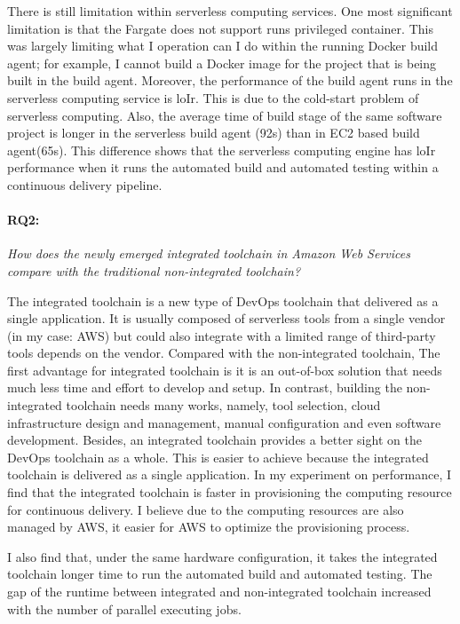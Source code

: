 There is still limitation within serverless computing services. One most significant limitation is that the Fargate does not support runs privileged container. This was largely limiting what I operation can I do within the running Docker build agent; for example, I cannot build a Docker image for the project that is being built in the build agent. Moreover, the performance of the build agent runs in the serverless computing service is loIr. This is due to the cold-start problem of serverless computing. Also, the average time of build stage of the same software project is longer in the serverless build agent (92s) than in EC2 based build agent(65s). This difference shows that the serverless computing engine has loIr performance when it runs the automated build and automated testing within a continuous delivery pipeline.
\paragraph{RQ2:} \textit{How does the newly emerged integrated toolchain in Amazon Web Services compare with the traditional non-integrated toolchain?}
\medskip
\par
The integrated toolchain is a new type of DevOps toolchain that delivered as a single application. It is usually composed of serverless tools from a single vendor (in my case: AWS) but could also integrate with a limited range of third-party tools depends on the vendor. Compared with the non-integrated toolchain, The first advantage for integrated toolchain is it is an out-of-box solution that needs much less time and effort to develop and setup. In contrast, building the non-integrated toolchain needs many works, namely, tool selection, cloud infrastructure design and management, manual configuration and even software development. Besides, an integrated toolchain provides a better sight on the DevOps toolchain as a whole. This is easier to achieve because the integrated toolchain is delivered as a single application. In my experiment on performance, I find that the integrated toolchain is faster in provisioning the computing resource for continuous delivery. I believe due to the computing resources are also managed by AWS, it easier for AWS to optimize the provisioning process.
\par
I also find that, under the same hardware configuration, it takes the integrated toolchain longer time to run the automated build and automated testing. The gap of the runtime between integrated and non-integrated toolchain increased with the number of parallel executing jobs.
